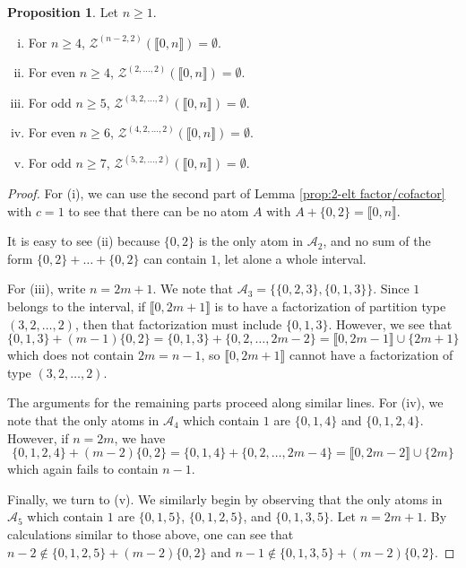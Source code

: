 \documentclass{report}
\newcommand{\Z}{\mathcal{Z}}
\newcommand{\llb}{\llbracket}
\newcommand{\rrb}{\rrbracket}
\renewcommand{\:}{\text{:}}
\theoremstyle{definition}
\newtheorem{prop}[defn]{Proposition}
\begin{document}
\begin{prop} \label{prop:bad types}
Let $n\ge 1$.
\begin{enumerate}[(i)]
\item For $n\ge 4$, $\Z^{(n-2,2)}(\llb 0,n \rrb) = \emptyset$.
\item For even $n\ge 4$, $\Z^{(2,\dots,2)}(\llb 0,n \rrb) = \emptyset$.
\item For odd $n\ge 5$, $\Z^{(3,2,\dots, 2)}(\llb 0,n \rrb) = \emptyset$.
\item For even $n\ge 6$, $\Z^{(4,2,\dots, 2)}(\llb 0,n \rrb) = \emptyset$.
\item For odd $n\ge 7$, $\Z^{(5,2,\dots, 2)}(\llb 0,n \rrb) = \emptyset$.
\end{enumerate}
\end{prop}
\begin{proof}
For (i), we can use the second part of Lemma \ref{prop:2-elt factor/cofactor} with $c = 1$ to see that there can be no atom $A$ with $A+\{0,2\} = \llb 0,n \rrb$.

It is easy to see (ii) because $\{0,2\}$ is the only atom in $\mathcal{A}_2$, and no sum of the form $\{0,2\} +\dots +\{0,2\}$ can contain $1$, let alone a whole interval.

For (iii), write $n = 2m+1$.
We note that $\mathcal{A}_3 = \{\{0,2,3\}, \{0,1,3\} \}$.
Since $1$ belongs to the interval, if $\llb 0,2m+1 \rrb$ is to have a factorization of partition type $(3,2,\dots,2)$, then that factorization must include $\{0,1,3\}$.
However, we see that 
\[ \{0,1,3\} + (m-1)\{0,2\}  = \{0,1,3\} + \{0,2,\dots, 2m-2\} = \llb 0, 2m-1 \rrb \cup \{2m+1\} \]
which does not contain $2m = n-1$, so $\llb 0,2m+1\rrb$ cannot have a factorization of type $(3,2,\dots,2)$.

The arguments for the remaining parts proceed along similar lines.
For (iv), we note that the only atoms in $\mathcal{A}_4$ which contain $1$ are $\{0,1,4\}$ and $\{0,1,2,4\}$.
However, if $n = 2m$, we have
\[ \{0,1,2,4\} + (m-2)\{0,2\} = \{0,1,4\} + \{0,2,\dots, 2m-4\} = \llb 0, 2m-2 \rrb \cup \{2m\} \]
which again fails to contain $n-1$.

Finally, we turn to (v).
We similarly begin by observing that the only atoms in $\mathcal{A}_5$ which contain $1$ are $\{0,1,5\}$, $\{0,1,2,5\}$, and $\{0,1,3,5\}$.
Let $n = 2m+1$.
By calculations similar to those above, one can see that $n-2 \notin \{0,1,2,5\} +(m-2)\{0,2\}$ and $n-1\notin \{0,1,3,5\} + (m-2)\{0,2\}$.
\end{proof}
\end{document}
